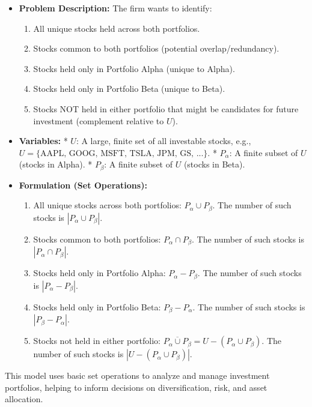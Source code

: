 \documentclass{article}
\begin{document}
\begin{itemize}
\begin{itemize}
\begin{itemize}
\begin{enumerate}
\begin{itemize}
\begin{itemize}
    \item \textbf{Problem Description:} The firm wants to identify:
        \begin{enumerate}
            \item All unique stocks held across both portfolios.
            \item Stocks common to both portfolios (potential overlap/redundancy).
            \item Stocks held only in Portfolio Alpha (unique to Alpha).
            \item Stocks held only in Portfolio Beta (unique to Beta).
            \item Stocks NOT held in either portfolio that might be candidates for future investment (complement relative to $U$).
        \end{enumerate}
    \item \textbf{Variables:}
        *   $U$: A large, finite set of all investable stocks, e.g., $U = \{\text{AAPL, GOOG, MSFT, TSLA, JPM, GS, ...}\}$.
        *   $P_\alpha$: A finite subset of $U$ (stocks in Alpha).
        *   $P_\beta$: A finite subset of $U$ (stocks in Beta).
    \item \textbf{Formulation (Set Operations):}
        \begin{enumerate}
            \item All unique stocks across both portfolios: $P_\alpha \cup P_\beta$. The number of such stocks is $|P_\alpha \cup P_\beta|$.
            \item Stocks common to both portfolios: $P_\alpha \cap P_\beta$. The number of such stocks is $|P_\alpha \cap P_\beta|$.
            \item Stocks held only in Portfolio Alpha: $P_\alpha - P_\beta$. The number of such stocks is $|P_\alpha - P_\beta|$.
            \item Stocks held only in Portfolio Beta: $P_\beta - P_\alpha$. The number of such stocks is $|P_\beta - P_\alpha|$.
            \item Stocks not held in either portfolio: $\overline{P_\alpha \cup P_\beta} = U - (P_\alpha \cup P_\beta)$. The number of such stocks is $|U - (P_\alpha \cup P_\beta)|$.
        \end{enumerate}
\end{itemize}
This model uses basic set operations to analyze and manage investment portfolios, helping to inform decisions on diversification, risk, and asset allocation.


\end{itemize}
\end{enumerate}
\end{itemize}
\end{itemize}
\end{itemize}
\end{document}
